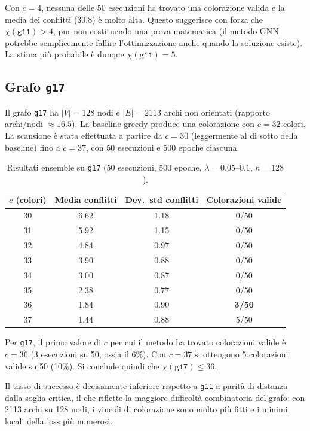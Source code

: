 \documentclass[11pt, a4paper]{article}
\begin{document}
Con $c = 4$, nessuna delle 50 esecuzioni ha trovato una colorazione valida e la media dei
conflitti (30.8) è molto alta. Questo suggerisce con forza che $\chi(\texttt{g11}) > 4$,
pur non costituendo una prova matematica (il metodo GNN potrebbe semplicemente fallire
l'ottimizzazione anche quando la soluzione esiste). La stima più probabile è dunque
$\chi(\texttt{g11}) = 5$.

\subsection*{Grafo \texttt{g17}}

Il grafo \texttt{g17} ha $|V| = 128$ nodi e $|E| = 2113$ archi non orientati (rapporto
archi/nodi $\approx 16.5$). La baseline greedy produce una colorazione con $c = 32$
colori. La scansione è stata effettuata a partire da $c = 30$ (leggermente al di sotto
della baseline) fino a $c = 37$, con 50 esecuzioni e 500 epoche ciascuna.

\begin{table}[h]
\centering
\caption{Risultati ensemble su \texttt{g17} (50 esecuzioni, 500 epoche, $\lambda = 0.05$--$0.1$, $h = 128$).}
\label{tab:g17}
\begin{tabular}{cccc}
\toprule
$c$ (colori) & Media conflitti & Dev.\ std conflitti & Colorazioni valide \\
\midrule
30 & 6.62 & 1.18 & 0/50 \\
31 & 5.92 & 1.15 & 0/50 \\
32 & 4.84 & 0.97 & 0/50 \\
33 & 3.90 & 0.88 & 0/50 \\
34 & 3.00 & 0.87 & 0/50 \\
35 & 2.38 & 0.77 & 0/50 \\
36 & 1.84 & 0.90 & \textbf{3/50} \\
37 & 1.44 & 0.88 & 5/50 \\
\bottomrule
\end{tabular}
\end{table}

Per \texttt{g17}, il primo valore di $c$ per cui il metodo ha trovato colorazioni valide
è $c = 36$ (3 esecuzioni su 50, ossia il 6\%). Con $c = 37$ si ottengono 5 colorazioni
valide su 50 (10\%). Si conclude quindi che $\chi(\texttt{g17}) \leq 36$.

Il tasso di successo è decisamente inferiore rispetto a \texttt{g11} a parità di distanza
dalla soglia critica, il che riflette la maggiore difficoltà combinatoria del grafo: con
2113 archi su 128 nodi, i vincoli di colorazione sono molto più fitti e i minimi locali
della loss più numerosi.
\end{document}
